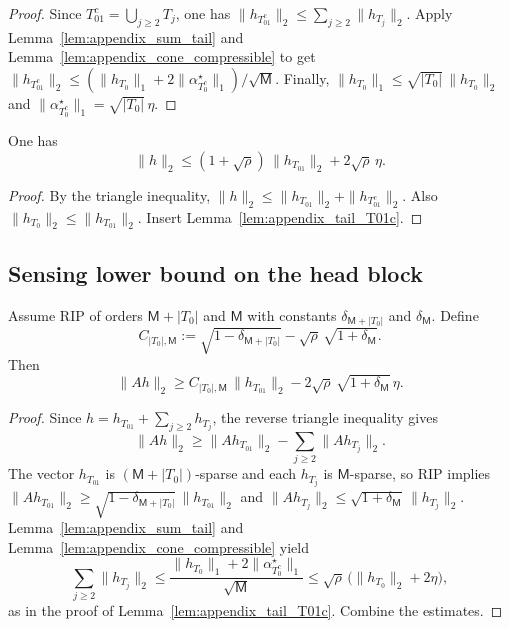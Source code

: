 \begin{proof}
Since $T_{01}^c=\bigcup_{j\ge 2}T_j$, one has $\|h_{T_{01}^c}\|_2\le \sum_{j\ge 2}\|h_{T_j}\|_2$.
Apply Lemma~\ref{lem:appendix_sum_tail} and Lemma~\ref{lem:appendix_cone_compressible} to get
$\|h_{T_{01}^c}\|_2\le (\|h_{T_0}\|_1+2\|\alpha^\star_{T_0^c}\|_1)/\sqrt{\mathsf{M}}$.
Finally, $\|h_{T_0}\|_1\le \sqrt{|T_0|}\,\|h_{T_0}\|_2$ and $\|\alpha^\star_{T_0^c}\|_1=\sqrt{|T_0|}\,\eta$.
\end{proof}

\begin{lemma}
\label{lem:appendix_global_l2}
One has
\begin{equation}
  \|h\|_2 \le (1+\sqrt{\rho})\,\|h_{T_{01}}\|_2 + 2\sqrt{\rho}\,\eta.
  \label{eq:appendix_global_l2}
\end{equation}
\end{lemma}

\begin{proof}
By the triangle inequality, $\|h\|_2\le \|h_{T_{01}}\|_2+\|h_{T_{01}^c}\|_2$.
Also $\|h_{T_0}\|_2\le \|h_{T_{01}}\|_2$.
Insert Lemma~\ref{lem:appendix_tail_T01c}.
\end{proof}

\subsection{Sensing lower bound on the head block}

\begin{lemma}
\label{lem:appendix_head_sensing}
Assume RIP of orders $\mathsf{M}+|T_0|$ and $\mathsf{M}$ with constants $\delta_{\mathsf{M}+|T_0|}$ and $\delta_{\mathsf{M}}$.
Define
\begin{equation}
  C_{|T_0|,\mathsf{M}}
  :=
  \sqrt{1-\delta_{\mathsf{M}+|T_0|}}
  -
  \sqrt{\rho}\,\sqrt{1+\delta_{\mathsf{M}}}.
  \label{eq:def_C_TM}
\end{equation}
Then
\begin{equation}
  \|Ah\|_2
  \ge
  C_{|T_0|,\mathsf{M}}\,\|h_{T_{01}}\|_2
  -
  2\sqrt{\rho}\,\sqrt{1+\delta_{\mathsf{M}}}\,\eta.
  \label{eq:appendix_Ah_lower}
\end{equation}
\end{lemma}

\begin{proof}
Since $h=h_{T_{01}}+\sum_{j\ge 2}h_{T_j}$, the reverse triangle inequality gives
\[
  \|Ah\|_2
  \ge
  \|A h_{T_{01}}\|_2 - \sum_{j\ge 2}\|A h_{T_j}\|_2.
\]
The vector $h_{T_{01}}$ is $(\mathsf{M}+|T_0|)$-sparse and each $h_{T_j}$ is $\mathsf{M}$-sparse, so RIP implies
$\|A h_{T_{01}}\|_2\ge \sqrt{1-\delta_{\mathsf{M}+|T_0|}}\,\|h_{T_{01}}\|_2$
and $\|A h_{T_j}\|_2\le \sqrt{1+\delta_{\mathsf{M}}}\,\|h_{T_j}\|_2$.
Lemma~\ref{lem:appendix_sum_tail} and Lemma~\ref{lem:appendix_cone_compressible} yield
\[
  \sum_{j\ge 2}\|h_{T_j}\|_2
  \le
  \frac{\|h_{T_0}\|_1+2\|\alpha^\star_{T_0^c}\|_1}{\sqrt{\mathsf{M}}}
  \le
  \sqrt{\rho}\,\bigl(\|h_{T_0}\|_2+2\eta\bigr),
\]
as in the proof of Lemma~\ref{lem:appendix_tail_T01c}.
Combine the estimates.
\end{proof}

